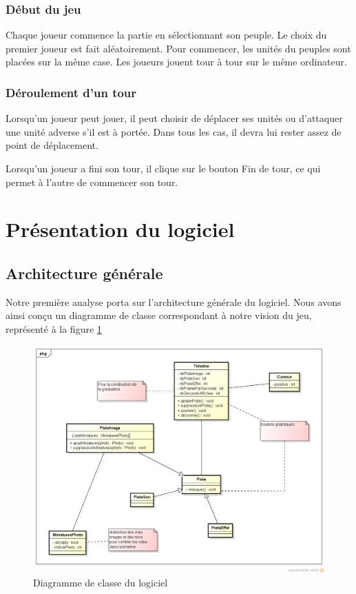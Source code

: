 \documentclass[12pt]{article}
\begin{document}
\subsubsection{Début du jeu}
Chaque joueur commence la partie en sélectionnant son peuple. Le choix du premier joueur est fait aléatoirement. Pour commencer, les unités du peuples sont placées sur la même case. Les joueurs jouent tour à tour sur le même ordinateur.
\subsubsection{Déroulement d'un tour}
Lorsqu'un joueur peut jouer, il peut choisir de déplacer ses unités ou d'attaquer une unité adverse s'il est à portée. Dans tous les cas, il devra lui rester assez de point de déplacement.

Lorsqu'un joueur a fini son tour, il clique sur le bouton Fin de tour, ce qui permet à l'autre de commencer son tour.
\newpage

\section{Présentation du logiciel}

\subsection{Architecture générale}
Notre première analyse porta sur l'architecture générale du logiciel. Nous avons ainsi conçu un diagramme de classe correspondant à notre vision du jeu, représenté à la figure \ref{classe}

\begin{figure}[!h] 
\centerline{\includegraphics[scale=0.60]{img/diag_class_ex.png}}
   \caption{\label{étiquette} Diagramme de classe du logiciel}
\label{classe}
\end{figure}
\end{document}
